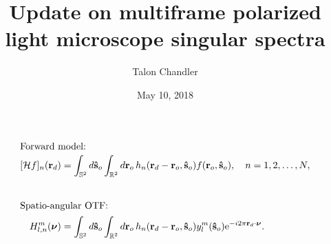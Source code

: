 \documentclass[presentation]{beamer}
\author{Talon Chandler}
\date{May 10, 2018}
\title{Update on multiframe polarized light microscope singular spectra}
\newcommand{\me}{\mathrm{e}}
\providecommand{\ro}[1]{\mathbf{\mathbf{r}}_o}
\providecommand{\so}[1]{\mathbf{\hat{s}}_o}
\providecommand{\rd}[1]{\mathbf{r}_d}
\providecommand{\mbb}[1]{\mathbb{#1}}
\providecommand{\bs}[1]{\boldsymbol{#1}}
\begin{document}
\maketitle

\begin{frame}
  \vspace{-2em}
  \begin{align*}
    \intertext{Forward model:}
    [\mathcal{H}f]_n(\rd{}) &= \int_{\mbb{S}^2}d\so{}\int_{\mbb{R}^2}d\ro{}\, h_n(\rd{}- \ro{}, \so{})f(\ro{}, \so{}),\quad  n=1, 2,\ldots,N,\\[2em]
    \intertext{Spatio-angular OTF:}
    H_{l,n}^{m}(\bs{\nu}) &= \int_{\mbb{S}^2}d\so{}\int_{\mbb{R}^2}d\ro{}\, h_n(\rd{}- \ro{}, \so{})y_l^m(\so{})\me^{-i 2\pi\rd{}\cdot\bs{\nu}}.
  \end{align*}
\end{frame}
\end{document}
